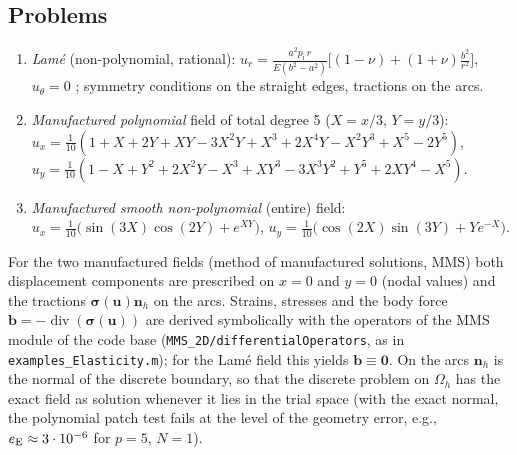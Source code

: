 \subsection{Problems}\label{sec:problems}
\begin{enumerate}
\item \emph{Lam\'e} (non-polynomial, rational): $u_r=\frac{a^2p_{\mathrm i}\,r}{E(b^2-a^2)}\bigl[(1-\nu)+(1+\nu)\tfrac{b^2}{r^2}\bigr]$, $u_\theta=0$
  \cite[Eq.~(25)]{Rajendran2010technique}; symmetry conditions on the straight
  edges, tractions on the arcs.
\item \emph{Manufactured polynomial} field of total degree 5 ($X=x/3$, $Y=y/3$):\\
  $u_x=\tfrac1{10}(1+X+2Y+XY-3X^2Y+X^3+2X^4Y-X^2Y^3+X^5-2Y^5)$,\\
  $u_y=\tfrac1{10}(1-X+Y^2+2X^2Y-X^3+XY^3-3X^3Y^2+Y^5+2XY^4-X^5)$.
\item \emph{Manufactured smooth non-polynomial} (entire) field:
  $u_x=\tfrac1{10}\bigl(\sin(3X)\cos(2Y)+e^{XY}\bigr)$, $u_y=\tfrac1{10}\bigl(\cos(2X)\sin(3Y)+Ye^{-X}\bigr)$.
\end{enumerate}
For the two manufactured fields (method of manufactured solutions, MMS) both displacement components are prescribed on
$x=0$ and $y=0$ (nodal values) and the tractions $\bm\sigma(\bm u)\bm n_h$ on the
arcs. Strains, stresses and the body force $\bm b=-\operatorname{div}(\bm\sigma(\bm u))$
are derived symbolically with the operators of the MMS module of the code base
(\texttt{MMS\_2D/differentialOperators}, as in \texttt{examples\_Elasticity.m});
for the Lam\'e field this yields $\bm b\equiv\bm0$. On the arcs $\bm n_h$ is the
normal of the discrete boundary, so that the discrete problem on $\Omega_h$ has
the exact field as solution whenever it lies in the trial space (with the exact
normal, the polynomial patch test fails at the level of the geometry error, e.g.,
$e_{\mathrm{E}}\approx3\cdot10^{-6}$ for $p=5$, $N=1$).

